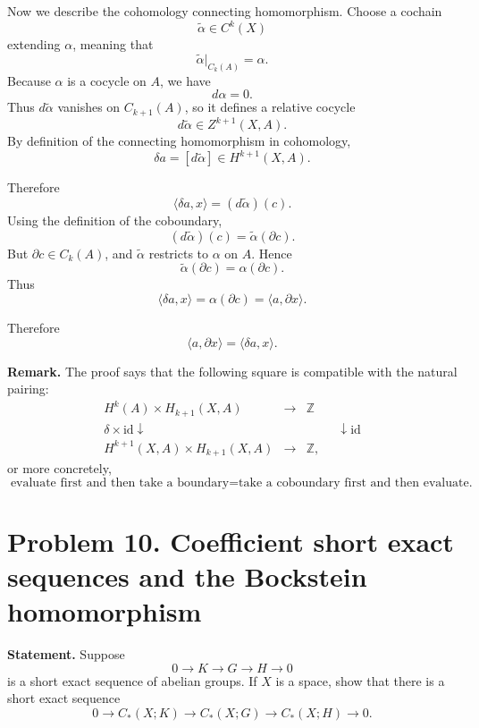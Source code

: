 \documentclass[12pt,a4paper]{article}
\theoremstyle{notespace}
\begin{document}
Now we describe the cohomology connecting homomorphism. Choose a cochain
\[
\widetilde{\alpha}\in C^k(X)
\]
extending \(\alpha\), meaning that
\[
\widetilde{\alpha}|_{C_k(A)}=\alpha.
\]
Because \(\alpha\) is a cocycle on \(A\), we have
\[
d\alpha=0.
\]
Thus \(d\widetilde{\alpha}\) vanishes on \(C_{k+1}(A)\), so it defines a relative cocycle
\[
d\widetilde{\alpha}\in Z^{k+1}(X,A).
\]
By definition of the connecting homomorphism in cohomology,
\[
\delta a=[d\widetilde{\alpha}]\in H^{k+1}(X,A).
\]

Therefore
\[
\langle \delta a,x\rangle
=
(d\widetilde{\alpha})(c).
\]
Using the definition of the coboundary,
\[
(d\widetilde{\alpha})(c)
=
\widetilde{\alpha}(\partial c).
\]
But \(\partial c\in C_k(A)\), and \(\widetilde{\alpha}\) restricts to \(\alpha\) on \(A\). Hence
\[
\widetilde{\alpha}(\partial c)
=
\alpha(\partial c).
\]
Thus
\[
\langle \delta a,x\rangle
=
\alpha(\partial c)
=
\langle a,\partial x\rangle.
\]

Therefore
\[
\boxed{
	\langle a,\partial x\rangle=\langle \delta a,x\rangle .
}
\]

\medskip

\textbf{Remark.}
The proof says that the following square is compatible with the natural pairing:
\[
\begin{array}{ccc}
	H^k(A)\times H_{k+1}(X,A) & \longrightarrow & \mathbb Z \\[1mm]
	\delta\times \mathrm{id}\downarrow\phantom{\delta\times \mathrm{id}} 
	&& 
	\phantom{\mathrm{id}\times \partial}\downarrow \mathrm{id} \\[1mm]
	H^{k+1}(X,A)\times H_{k+1}(X,A) & \longrightarrow & \mathbb Z ,
\end{array}
\]
or more concretely,
\[
\boxed{
	\text{evaluate first and then take a boundary}
	=
	\text{take a coboundary first and then evaluate.}
}
\]

\bigskip

\section{Problem 10. Coefficient short exact sequences and the Bockstein homomorphism}

\textbf{Statement.}
Suppose
\[
0\longrightarrow K\longrightarrow G\longrightarrow H\longrightarrow 0
\]
is a short exact sequence of abelian groups. If \(X\) is a space, show that there is a short exact sequence
\[
0\longrightarrow C_*(X;K)\longrightarrow C_*(X;G)\longrightarrow C_*(X;H)\longrightarrow 0.
\]
\end{document}
